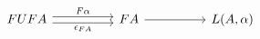 \[\begin{tikzcd}
	FUFA && FA && {L(A,\alpha)}
	\arrow["F\alpha", shift left, from=1-1, to=1-3]
	\arrow["{\epsilon_{FA}}"', shift right, from=1-1, to=1-3]
	\arrow[from=1-3, to=1-5]
\end{tikzcd}\]